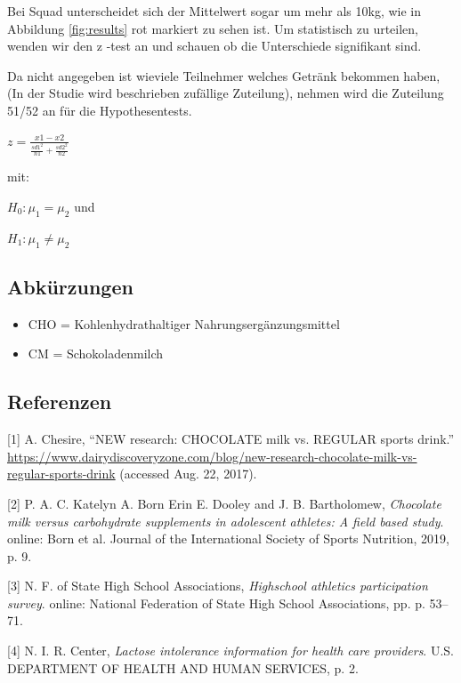 \documentclass[
]{article}
\providecommand{\tightlist}{%
  \setlength{\itemsep}{0pt}\setlength{\parskip}{0pt}}
\newenvironment{cslreferences}%
  {}%
  {\par}
\begin{document}
Bei Squad unterscheidet sich der Mittelwert sogar um mehr als 10kg, wie
in Abbildung \ref{fig:results} rot markiert zu sehen ist. Um statistisch
zu urteilen, wenden wir den z -test an und schauen ob die Unterschiede
signifikant sind.

Da nicht angegeben ist wieviele Teilnehmer welches Getränk bekommen
haben, (In der Studie wird beschrieben zufällige Zuteilung), nehmen wird
die Zuteilung 51/52 an für die Hypothesentests.

\(z=\frac{x1-x2}{ \frac{sd1^{2}}{n1} + \frac{sd2^{2}}{n2} }\)

mit:

\(H_{0} : \mu_{1} = \mu_{2}\) und

\(H_{1} : \mu_{1} \neq \mu_{2}\)

\newpage

\hypertarget{abkuxfcrzungen}{%
\subsection{Abkürzungen}\label{abkuxfcrzungen}}

\begin{itemize}
\tightlist
\item
  CHO = Kohlenhydrathaltiger Nahrungsergänzungsmittel
\item
  CM = Schokoladenmilch
\end{itemize}

\hypertarget{referenzen}{%
\subsection{Referenzen}\label{referenzen}}

\hypertarget{refs}{}
\begin{cslreferences}
\leavevmode\hypertarget{ref-article}{}%
{[}1{]} A. Chesire, ``NEW research: CHOCOLATE milk vs. REGULAR sports
drink.''
\url{https://www.dairydiscoveryzone.com/blog/new-research-chocolate-milk-vs-regular-sports-drink}
(accessed Aug. 22, 2017).

\leavevmode\hypertarget{ref-study}{}%
{[}2{]} P. A. C. Katelyn A. Born Erin E. Dooley and J. B. Bartholomew,
\emph{Chocolate milk versus carbohydrate supplements in adolescent
athletes: A field based study}. online: Born et al. Journal of the
International Society of Sports Nutrition, 2019, p. 9.

\leavevmode\hypertarget{ref-survey}{}%
{[}3{]} N. F. of State High School Associations, \emph{Highschool
athletics participation survey}. online: National Federation of State
High School Associations, pp. p. 53--71.

\leavevmode\hypertarget{ref-lactose}{}%
{[}4{]} N. I. R. Center, \emph{Lactose intolerance information for
health care providers}. U.S. DEPARTMENT OF HEALTH AND HUMAN SERVICES, p.
2.
\end{cslreferences}
\end{document}
